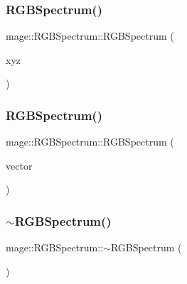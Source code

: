 \hypertarget{structmage_1_1_r_g_b_spectrum_a7c87ee10a81c55b1954915c1abea0cb9}{}\label{structmage_1_1_r_g_b_spectrum_a7c87ee10a81c55b1954915c1abea0cb9} 
\subsubsection{\texorpdfstring{R\+G\+B\+Spectrum()}{RGBSpectrum()}\hspace{0.1cm}{\footnotesize\ttfamily [4/5]}}
{\footnotesize\ttfamily mage\+::\+R\+G\+B\+Spectrum\+::\+R\+G\+B\+Spectrum (\begin{DoxyParamCaption}\item[{const \hyperlink{structmage_1_1_x_y_z_spectrum}{X\+Y\+Z\+Spectrum} \&}]{xyz }\end{DoxyParamCaption})}

\hypertarget{structmage_1_1_r_g_b_spectrum_af2837c778d5aa9b065f5b8b0a039fa02}{}\label{structmage_1_1_r_g_b_spectrum_af2837c778d5aa9b065f5b8b0a039fa02} 
\subsubsection{\texorpdfstring{R\+G\+B\+Spectrum()}{RGBSpectrum()}\hspace{0.1cm}{\footnotesize\ttfamily [5/5]}}
{\footnotesize\ttfamily mage\+::\+R\+G\+B\+Spectrum\+::\+R\+G\+B\+Spectrum (\begin{DoxyParamCaption}\item[{const X\+M\+F\+L\+O\+A\+T3 \&}]{vector }\end{DoxyParamCaption})\hspace{0.3cm}{\ttfamily [explicit]}}

\hypertarget{structmage_1_1_r_g_b_spectrum_a7c18a007349953b1e4711a4856680b02}{}\label{structmage_1_1_r_g_b_spectrum_a7c18a007349953b1e4711a4856680b02} 
\subsubsection{\texorpdfstring{$\sim$\+R\+G\+B\+Spectrum()}{~RGBSpectrum()}}
{\footnotesize\ttfamily mage\+::\+R\+G\+B\+Spectrum\+::$\sim$\+R\+G\+B\+Spectrum (\begin{DoxyParamCaption}{ }\end{DoxyParamCaption})\hspace{0.3cm}{\ttfamily [default]}}



